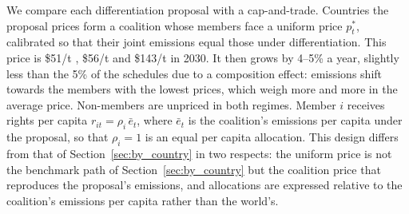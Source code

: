 \documentclass[12pt,english]{article}
\theoremstyle{remark}
\begin{document}
We compare each differentiation proposal with a cap-and-trade. Countries the proposal prices form a coalition whose members face a uniform price $p^*_t$, calibrated so that their joint emissions equal those under differentiation.
This price is \$51/t \citep{wolfram_building_2025}, \$56/t \citep{banerjee_grand_2025} and \$143/t \citep{equal_right_climate_2023} in 2030. It then grows by 4--5\% a year, slightly less than the 5\% of the schedules due to a composition effect: emissions shift towards the members with the lowest prices, which weigh more and more in the average price.
Non-members are unpriced in both regimes. Member $i$ receives rights per capita $r_{it}=\rho_i\,\bar e_t$, where $\bar e_t$ is the coalition's emissions per capita under the proposal, so that $\rho_i=1$ is an equal per capita allocation. This design differs from that of Section~\ref{sec:by_country} in two respects: the uniform price is not the benchmark path of Section~\ref{sec:by_country} but the coalition price that reproduces the proposal's emissions, and allocations are expressed relative to the coalition's emissions per capita rather than the world's.
\end{document}
